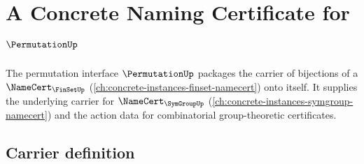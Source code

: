 \chapter{A Concrete Naming Certificate for $\PermutationUp$}
\label{ch:concrete-instances-permutation-namecert}

The permutation interface $\PermutationUp$ packages the carrier of bijections of a $\NameCert_{\FinSetUp}$ (\autoref{ch:concrete-instances-finset-namecert}) onto itself. It supplies the underlying carrier for $\NameCert_{\SymGroupUp}$ (\autoref{ch:concrete-instances-symgroup-namecert}) and the action data for combinatorial group-theoretic certificates.

\section{Carrier definition}
\label{sec:permutation-carrier}

